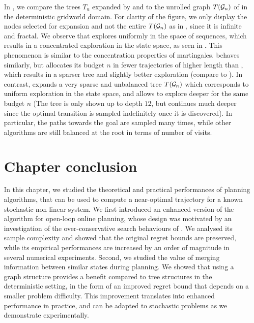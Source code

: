 In , we compare the trees $T_n$ expanded by \OPD and \KLOLOP to the unrolled graph $T(\mathcal{G}_n)$ of \GBOPD in the deterministic gridworld domain. For clarity of the figure, we only display the nodes selected for expansion and not the entire $T(\mathcal{G}_n)$ as in , since it is infinite and fractal. We observe that \OPD explores uniformly in the space of sequences, which results in a concentrated exploration in the state space, as seen in . This phenomenon is similar to the concentration properties of martingales. \KLOLOP behaves similarly, but allocates its budget $n$ in fewer trajectories of higher length than \OPD, which results in a sparser tree and slightly better exploration (compare  to ). In contrast, \GBOPD expands a very sparse and unbalanced tree $T(\mathcal{G}_n)$ which corresponds to uniform exploration in the state space, and allows to explore deeper for the same budget $n$ (The tree is only shown up to depth $12$, but continues much deeper since the optimal transition is sampled indefinitely once it is discovered). In particular, the paths towards the goal are sampled many times, while other algorithms are still balanced at the root in terms of number of visits.

\section*{Chapter conclusion}

In this chapter, we studied the theoretical and practical performances of planning algorithms, that can be used to compute a near-optimal trajectory for a known stochastic non-linear system.
We first introduced an enhanced version of the \OLOP algorithm for open-loop online planning, whose design was motivated by an investigation of the over-conservative search behaviours of \OLOP. We analysed its sample complexity and showed that the original regret bounds are preserved, while its empirical performances are increased by an order of magnitude in several numerical experiments. Second, we studied the value of merging information between similar states during planning. We showed that using a graph structure provides a benefit compared to tree structures in the deterministic setting, in the form of an improved regret bound that depends on a smaller problem difficulty. This improvement translates into enhanced performance in practice, and can be adapted to stochastic problems as we demonstrate experimentally.

%
